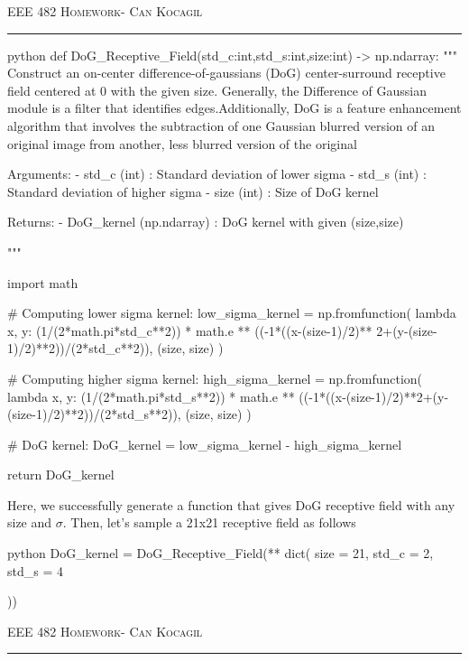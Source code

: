 \documentclass[12pt]{amsart}
\begin{document}
\newpage
{\scshape EEE 482} \hfill {\scshape \large  Homework-\relax} \hfill {\scshape Can Kocagil}
\smallskip
\hrule
\vspace{2mm}

\begin{mintedbox}{python}
def DoG_Receptive_Field(std_c:int,std_s:int,size:int) -> np.ndarray:
    """
        Construct an on-center difference-of-gaussians (DoG) center-surround receptive field    centered at 0 with the given size. Generally, the Difference of Gaussian module is a   filter that  identifies edges.Additionally, DoG is a feature enhancement algorithm that involves the subtraction of one Gaussian blurred version of an original image from another, less blurred version of the original

            Arguments:
                - std_c (int) : Standard deviation of lower sigma
                - std_s (int) : Standard deviation of higher sigma
                - size  (int) : Size of DoG kernel

            Returns:
               - DoG_kernel (np.ndarray) : DoG kernel with given (size,size)

    """

    import math
    
    # Computing lower sigma kernel:
    low_sigma_kernel  = np.fromfunction(
        lambda x, y: (1/(2*math.pi*std_c**2)) * math.e ** ((-1*((x-(size-1)/2)** 2+(y-(size-1)/2)**2))/(2*std_c**2)), (size, size)        
        )

    # Computing higher sigma kernel:
    high_sigma_kernel = np.fromfunction(
        lambda x, y: (1/(2*math.pi*std_s**2)) * math.e ** ((-1*((x-(size-1)/2)**2+(y-(size-1)/2)**2))/(2*std_s**2)), (size, size)
        )

    # DoG kernel:
    DoG_kernel = low_sigma_kernel - high_sigma_kernel

    return DoG_kernel
\end{mintedbox}

Here, we successfully generate a function that gives DoG receptive field with any size and $\sigma$. Then, let's sample a 21x21 receptive field as follows

\begin{mintedbox}{python}
DoG_kernel = DoG_Receptive_Field(**
dict(
    size = 21,
    std_c = 2,
    std_s = 4

))
\end{mintedbox}


\newpage
{\scshape EEE 482} \hfill {\scshape \large  Homework-\relax} \hfill {\scshape Can Kocagil}
\smallskip
\hrule
\vspace{2mm}
\end{document}
